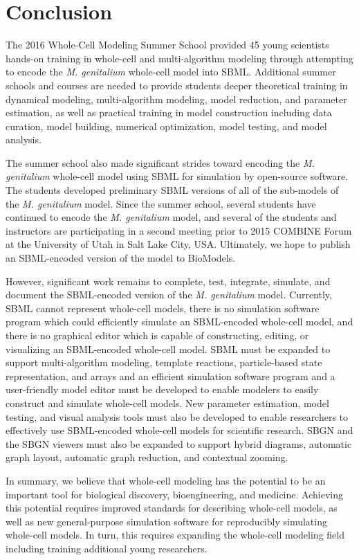\documentclass[journal,transmag]{IEEEtran}
\begin{document}
\section{Conclusion}
The 2016 Whole-Cell Modeling Summer School provided 45 young scientists hands-on training in whole-cell and multi-algorithm modeling through attempting to encode the \textit{M. genitalium} whole-cell model into SBML. Additional summer schools and courses are needed to provide students deeper theoretical training in dynamical modeling, multi-algorithm modeling, model reduction, and parameter estimation, as well as practical training in model construction including data curation, model building, numerical optimization, model testing, and model analysis.

The summer school also made significant strides toward encoding the \textit{M. genitalium} whole-cell model using SBML for simulation by open-source software. The students developed preliminary SBML versions of all of the sub-models of the \textit{M. genitalium} model. Since the summer school, several students have continued to encode the \textit{M. genitalium} model, and several of the students and instructors are participating in a second meeting prior to 2015 COMBINE Forum at the University of Utah in Salt Lake City, USA. Ultimately, we hope to publish an SBML-encoded version of the model to BioModels. 

However, significant work remains to complete, test, integrate, simulate, and document the SBML-encoded version of the \textit{M. genitalium} model. Currently, SBML cannot represent whole-cell models, there is no simulation software program which could efficiently simulate an SBML-encoded whole-cell model, and there is no graphical editor which is capable of constructing, editing, or visualizing an SBML-encoded whole-cell model. SBML must be expanded to support multi-algorithm modeling, template reactions, particle-based state representation, and arrays and an efficient simulation software program and a user-friendly model editor must be developed to enable modelers to easily construct and simulate whole-cell models. New parameter estimation, model testing, and visual analysis tools must also be developed to enable researchers to effectively use SBML-encoded whole-cell models for scientific research. SBGN and the SBGN viewers must also be expanded to support hybrid diagrams, automatic graph layout, automatic graph reduction, and contextual zooming.

In summary, we believe that whole-cell modeling has the potential to be an important tool for biological discovery, bioengineering, and medicine. Achieving this potential requires improved standards for describing whole-cell models, as well as new general-purpose simulation software for reproducibly simulating whole-cell models. In turn, this requires expanding the whole-cell modeling field including training additional young researchers.
\end{document}

